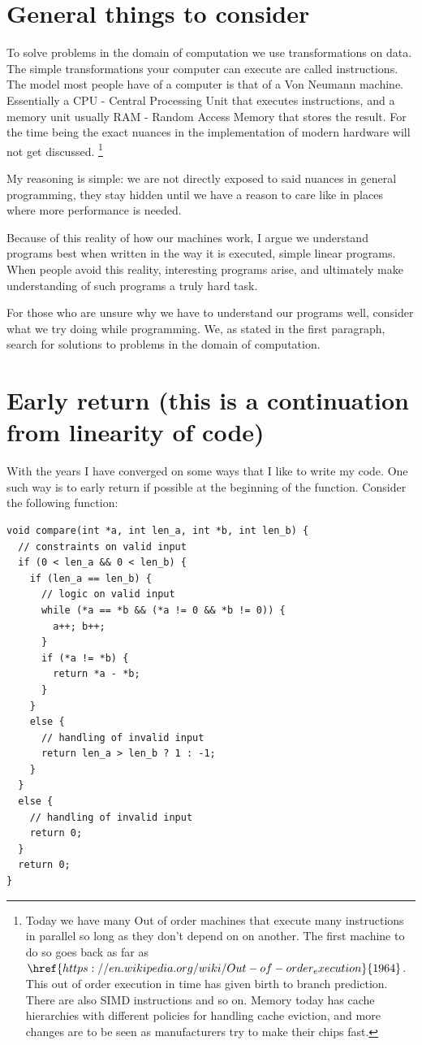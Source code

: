 \documentclass[a4paper]{article}
\begin{document}
\section{General things to consider}
To solve problems in the domain of computation we use transformations on data. The simple 
transformations your computer can execute are called instructions. The model most people 
have of a computer is that of a Von Neumann machine. Essentially a CPU - Central Processing 
Unit that executes instructions, and a memory unit usually RAM - Random Access Memory 
that stores the result. For the time being the exact nuances in the implementation of 
modern hardware will not get discussed. 
\footnote{Today we have many Out of order machines that execute many instructions in parallel so long as they don't depend on on another. The first machine to do so goes back as far as $\href{https://en.wikipedia.org/wiki/Out-of-order_execution}{1964}$. This out of order execution in time has given birth to branch prediction. There are also SIMD instructions and so on. Memory today has cache hierarchies with different policies for handling cache eviction, and more changes are to be seen as manufacturers try to make their chips fast.}  

My reasoning is simple: we are not directly exposed to said nuances in general programming, they stay hidden until we have a reason to care like in places where more performance is needed.

Because of this reality of how our machines work, I argue we understand programs best when written in the way it is executed, simple linear programs. When people avoid this reality, interesting programs arise, and ultimately make understanding of such programs a truly hard task.

For those who are unsure why we have to understand our programs well, consider what we try doing while programming. We, as stated in the first paragraph, search for solutions to problems in the domain of computation. 


\section{Early return (this is a continuation from linearity of code)}
With the years I have converged on some ways that I like to write my code. One such way is to early return if possible at the beginning of the function. Consider the following function:

\begin{lstlisting}
void compare(int *a, int len_a, int *b, int len_b) { 
  // constraints on valid input
  if (0 < len_a && 0 < len_b) {
    if (len_a == len_b) {
      // logic on valid input
      while (*a == *b && (*a != 0 && *b != 0)) { 
        a++; b++;
      }
      if (*a != *b) { 
        return *a - *b;
      }
    }
    else {
      // handling of invalid input
      return len_a > len_b ? 1 : -1; 
    }
  }
  else { 
    // handling of invalid input
    return 0; 
  }
  return 0;
}   
\end{lstlisting}
\end{document}
